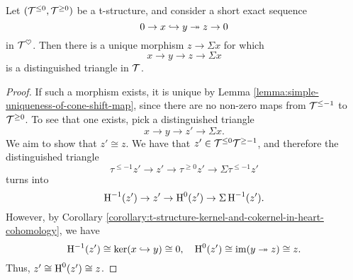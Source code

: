 \begin{corollary}\label{corollary:t-structure-exact-sequence-in-heart-induces-unique-distinguished-triangle}
	Let \((\mathcal{T}^{\leq 0},\mathcal{T}^{\geq 0})\) be a t-structure, and consider a short exact sequence
	\[ 0 \to x \hookrightarrow y \twoheadrightarrow z \to 0 \]
	in \(\mathcal{T}^\heartsuit\). Then there is a unique morphism \(z \to \Sigma x\) for which
	\[ x \to y \to z \to \Sigma x \]
	is a distinguished triangle in \(\mathcal{T}\).
\end{corollary}
\begin{proof}
If such a morphism exists, it is unique by Lemma \ref{lemma:simple-uniqueness-of-cone-shift-map}, since there are no non-zero maps from \(\mathcal{T}^{\leq -1}\) to \(\mathcal{T}^{\geq 0}\). To see that one exists,
pick a distinguished triangle
\[ x \to y \to z' \to \Sigma x. \]
We aim to show that \(z' \cong z\). We have that \(z'\in\mathcal{T}^{\leq 0}\mathcal{T}^{\geq -1}\), and therefore the distinguished triangle
\[ \tau^{\leq -1}z' \to z' \to \tau^{\geq 0}z' \to \Sigma\tau^{\leq -1}z' \]
turns into
\[ \operatorname{H}^{-1}(z') \to z' \to \operatorname{H}^0(z') \to \Sigma \operatorname{H}^{-1}(z'). \]
However, by Corollary \ref{corollary:t-structure-kernel-and-cokernel-in-heart-cohomology}, we have
\[ \operatorname{H}^{-1}(z') \cong \ker(x\hookrightarrow y) \cong 0,\quad \operatorname{H}^0(z')\cong \operatorname{im}(y\twoheadrightarrow z) \cong z. \]
Thus, \(z' \cong \operatorname{H}^0(z') \cong z\).
\end{proof}

